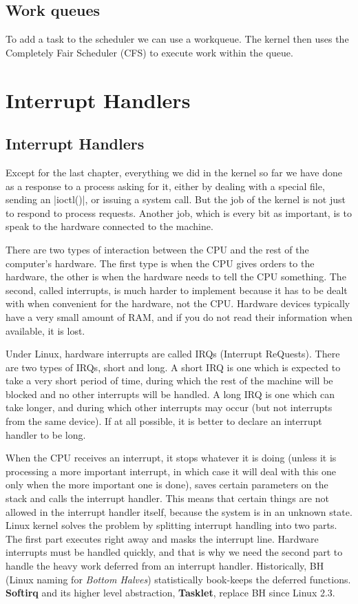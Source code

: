 \documentclass[10pt, oneside]{book}
\begin{document}
\subsection{Work queues}
\label{sec:workqueue}
To add a task to the scheduler we can use a workqueue.
The kernel then uses the Completely Fair Scheduler (CFS) to execute work within the queue.


\section{Interrupt Handlers}
\label{sec:interrupt_handler}
\subsection{Interrupt Handlers}
\label{sec:irq}
Except for the last chapter, everything we did in the kernel so far we have done as a response to a process asking for it, either by dealing with a special file, sending an \cpp|ioctl()|, or issuing a system call.
But the job of the kernel is not just to respond to process requests.
Another job, which is every bit as important, is to speak to the hardware connected to the machine.

There are two types of interaction between the CPU and the rest of the computer's hardware.
The first type is when the CPU gives orders to the hardware, the other is when the hardware needs to tell the CPU something.
The second, called interrupts, is much harder to implement because it has to be dealt with when convenient for the hardware, not the CPU.
Hardware devices typically have a very small amount of RAM, and if you do not read their information when available, it is lost.

Under Linux, hardware interrupts are called IRQs (Interrupt ReQuests).
There are two types of IRQs, short and long.
A short IRQ is one which is expected to take a very short period of time, during which the rest of the machine will be blocked and no other interrupts will be handled.
A long IRQ is one which can take longer, and during which other interrupts may occur (but not interrupts from the same device).
If at all possible, it is better to declare an interrupt handler to be long.

When the CPU receives an interrupt, it stops whatever it is doing (unless it is processing a more important interrupt, in which case it will deal with this one only when the more important one is done),
saves certain parameters on the stack and calls the interrupt handler.
This means that certain things are not allowed in the interrupt handler itself, because the system is in an unknown state.
Linux kernel solves the problem by splitting interrupt handling into two parts.
The first part executes right away and masks the interrupt line.
Hardware interrupts must be handled quickly, and that is why we need the second part to handle the heavy work deferred from an interrupt handler.
Historically, BH (Linux naming for \textit{Bottom Halves}) statistically book-keeps the deferred functions.
\textbf{Softirq} and its higher level abstraction, \textbf{Tasklet}, replace BH since Linux 2.3.
\end{document}
